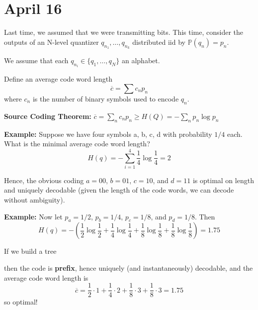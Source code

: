 \documentclass[12pt]{report}
\renewcommand{\P}{\mathbb{P}}
\renewcommand{\bar}[1]{\overline{#1}}
\newcommand*{\tbf}[1]{\ifmmode\mathbf{#1}\else\textbf{#1}\fi}
\newenvironment*{proposition}[1][gray]{
    \begin{tcolorbox}[
        parbox=false,
        colback=#1!5!white,
        colframe=#1!75!black,
        breakable
    ]}
    {\end{tcolorbox}}
\begin{document}
\section{April 16}

Last time, we assumed that we were transmitting bits. This time, consider the outputs of an N-level quantizer $q_{n_1}, \dots, q_{n_k}$ distributed iid by $\P(q_n) = p_n$. 

We assume that each $q_{n_i} \in \{q_1, \dots, q_N\}$ an alphabet. 

Define an average code word length 
\[\bar c = \sum c_n p_n\] 
where $c_n$ is the number of binary symbols used to encode $q_n$.

\begin{proposition}
    \textbf{Source Coding Theorem:} $\bar c = \sum_n c_n p_n \geq H(Q) = -\sum_n p_n \log p_n$
\end{proposition}

\tbf{Example:} Suppose we have four symbols a, b, c, d with probability $1/4$ each. What is the minimal average code word length?
\[H(q) = -\sum_{i=1}^4 \frac{1}{4} \log \frac{1}{4} = 2\]

Hence, the obvious coding $a = 00$, $b = 01$, $c = 10$, and $d = 11$ is optimal on length and uniquely decodable (given the length of the code words, we can decode without ambiguity).

\tbf{Example:} Now let $p_a = 1/2$, $p_b = 1/4$, $p_c = 1/8$, and $p_d = 1/8$. Then
\[H(q) = -\left(\frac{1}{2} \log \frac{1}{2} + \frac{1}{4} \log \frac{1}{4} + \frac{1}{8} \log \frac{1}{8} + \frac{1}{8} \log \frac{1}{8}\right) = 1.75\]

If we build a tree 

\begin{center}
    
\end{center}

then the code is \tbf{prefix}, hence uniquely (and instantaneously) decodable, and the average code word length is
\[\bar c = \frac{1}{2} \cdot 1 + \frac{1}{4} \cdot 2 + \frac{1}{8} \cdot 3 + \frac{1}{8} \cdot 3 = 1.75\]
so optimal!
\end{document}
